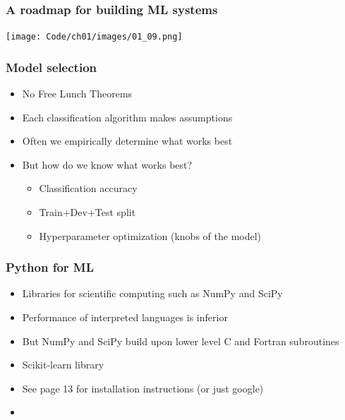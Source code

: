 \documentclass{beamer}
\begin{document}
\begin{frame}
  \frametitle{A roadmap for building ML systems}
  \texttt{[image: Code/ch01/images/01\_09.png]}
\end{frame}

\begin{frame}
  \frametitle{Model selection}
  \begin{itemize}
  \item No Free Lunch Theorems
  \item Each classification algorithm makes assumptions
  \item Often we empirically determine what works best
  \item But how do we know what works best?
    \begin{itemize}
    \item Classification accuracy
    \item Train+Dev+Test split
    \item Hyperparameter optimization (knobs of the model)
    \end{itemize}
  \end{itemize}
\end{frame}

\begin{frame}
  \frametitle{Python for ML}
  \begin{itemize}
  \item Libraries for scientific computing such as NumPy and SciPy
  \item Performance of interpreted languages is inferior
  \item But NumPy and SciPy build upon lower level C and Fortran subroutines
  \item Scikit-learn library
  \item See page 13 for installation instructions (or just google)
  \item \href{http://www-ekp.physik.uni-karlsruhe.de/~giffels/GridKa-School-Lectures/NumPy.slides.html}{}
  \end{itemize}
\end{frame}
\end{document}
